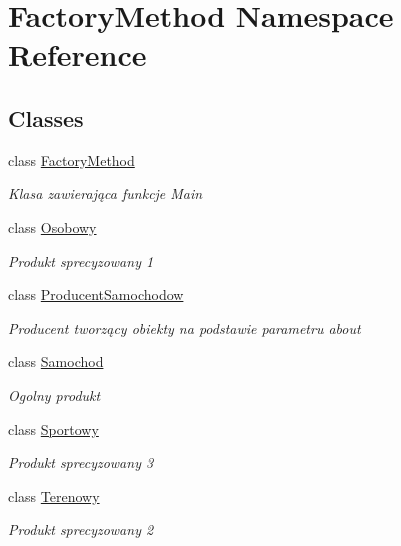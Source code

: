 \hypertarget{namespace_factory_method}{}\section{Factory\+Method Namespace Reference}
\label{namespace_factory_method}
\subsection*{Classes}
\begin{DoxyCompactItemize}
\item 
class \hyperlink{class_factory_method_1_1_factory_method}{Factory\+Method}
\begin{DoxyCompactList}\small\item\em Klasa zawierająca funkcje Main \end{DoxyCompactList}\item 
class \hyperlink{class_factory_method_1_1_osobowy}{Osobowy}
\begin{DoxyCompactList}\small\item\em Produkt sprecyzowany 1 \end{DoxyCompactList}\item 
class \hyperlink{class_factory_method_1_1_producent_samochodow}{Producent\+Samochodow}
\begin{DoxyCompactList}\small\item\em Producent tworzący obiekty na podstawie parametru about \end{DoxyCompactList}\item 
class \hyperlink{class_factory_method_1_1_samochod}{Samochod}
\begin{DoxyCompactList}\small\item\em Ogolny produkt \end{DoxyCompactList}\item 
class \hyperlink{class_factory_method_1_1_sportowy}{Sportowy}
\begin{DoxyCompactList}\small\item\em Produkt sprecyzowany 3 \end{DoxyCompactList}\item 
class \hyperlink{class_factory_method_1_1_terenowy}{Terenowy}
\begin{DoxyCompactList}\small\item\em Produkt sprecyzowany 2 \end{DoxyCompactList}\end{DoxyCompactItemize}
